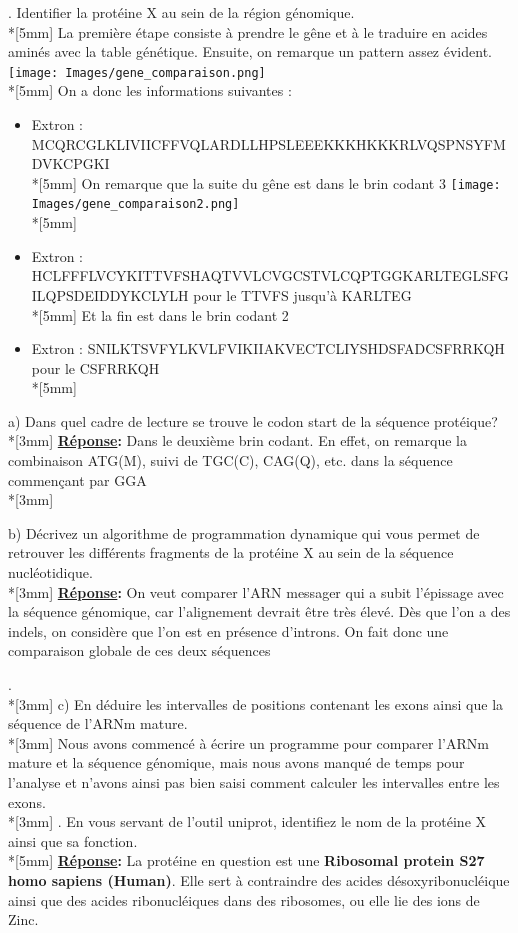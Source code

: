 \documentclass[11pt, letterpaper]{article}
\begin{document}
{. Identifier la protéine X au sein de la région génomique. \\*[5mm]
 La première étape consiste à prendre le gêne et à le traduire en acides aminés avec la table génétique. Ensuite, on remarque un pattern assez évident.
\texttt{[image: Images/gene\_comparaison.png]} \\*[5mm]
On a donc les informations suivantes : 
\begin{itemize}
\item Extron : MCQRCGLKLIVIICFFVQLARDLLHPSLEEEKKKHKKKRLVQSPNSYFMDVKCPGKI \\*[5mm]
On remarque que la suite du gêne est dans le brin codant 3 
\texttt{[image: Images/gene\_comparaison2.png]} \\*[5mm]
\item Extron : HCLFFFLVCYKITTVFSHAQTVVLCVGCSTVLCQPTGGKARLTEGLSFGILQPSDEIDDYKCLYLH pour le TTVFS jusqu'à KARLTEG \\*[5mm]
Et la fin est dans le brin codant 2
\item Extron : SNILKTSVFYLKVLFVIKIIAKVECTCLIYSHDSFADCSFRRKQH pour le CSFRRKQH \\*[5mm]
\end{itemize}
a) Dans quel cadre de lecture se trouve le codon start de la séquence protéique? \\*[3mm]
\textbf{\underline{Réponse}:} Dans le deuxième brin codant. En effet, on remarque la combinaison ATG(M), suivi de TGC(C), CAG(Q), etc. dans la séquence commençant par GGA\\*[3mm]

b) Décrivez un algorithme de programmation dynamique qui vous permet de retrouver les différents fragments de la protéine X au sein de la séquence nucléotidique. \\*[3mm]
\textbf{\underline{Réponse}:} On veut comparer l'ARN messager qui a subit l'épissage avec la séquence génomique, car l'alignement devrait être très élevé. Dès que l'on a des indels, on considère que l'on est en présence d'introns. On fait donc une comparaison globale de ces deux séquences }. \\*[3mm]
c) En déduire les intervalles de positions contenant les exons ainsi que la séquence de l'ARNm mature. \\*[3mm]
Nous avons commencé à écrire un programme pour comparer l'ARNm mature et la séquence génomique, mais nous avons manqué de temps pour l'analyse et n'avons ainsi pas bien saisi comment calculer les intervalles entre les exons. \\*[3mm]
. En vous servant de l'outil uniprot, identifiez le nom de la protéine X ainsi que sa fonction. \\*[5mm]
\textbf{\underline{Réponse}:} La protéine en question est une \textbf{Ribosomal protein S27 homo sapiens (Human)}. Elle sert à contraindre des acides désoxyribonucléique ainsi que des acides ribonucléiques dans des ribosomes, ou elle lie des ions de Zinc.
\end{document}
